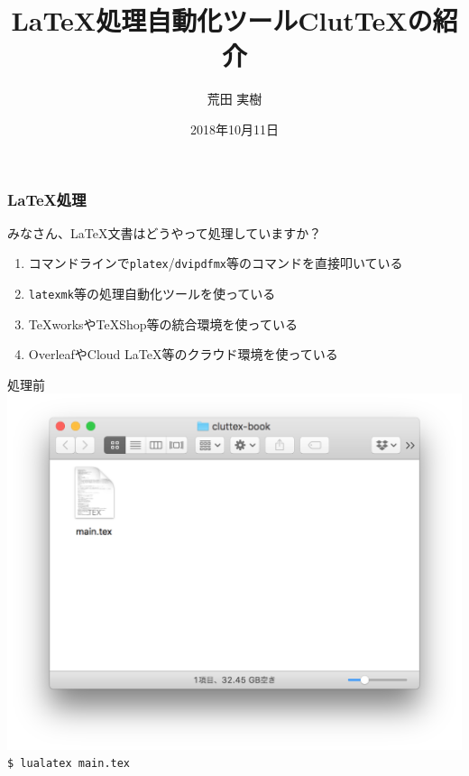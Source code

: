\documentclass[aspectratio=169]{beamer}
\title{\LaTeX 処理自動化ツールClut\TeX の紹介}
\author{荒田 実樹}
\date{2018年10月11日}
\begin{document}
\begin{frame}\frametitle{}
  \titlepage
\end{frame}
\begin{frame}\frametitle{\LaTeX 処理}
  みなさん、\LaTeX{}文書はどうやって処理していますか？
  \pause
  \begin{enumerate}
  \item コマンドラインで\texttt{platex}/\texttt{dvipdfmx}等のコマンドを直接叩いている
  \item \texttt{latexmk}等の処理自動化ツールを使っている
  \item \TeX{}worksや\TeX{}Shop等の統合環境を使っている
  \item OverleafやCloud LaTeX等のクラウド環境を使っている
  \end{enumerate}
\end{frame}
\begin{frame}[plain]
  \begin{block}{処理前}
    \centering
    \includegraphics[height=0.6\paperheight]{latex-before.png}\\
    \texttt{\$ lualatex main.tex}
  \end{block}
\end{frame}
\end{document}

